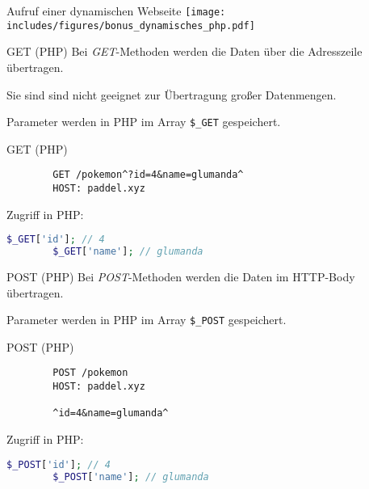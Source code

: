 \begin{bonus}{Aufruf einer dynamischen Webseite}
    \centering
    \texttt{[image: includes/figures/bonus\_dynamisches\_php.pdf]}
\end{bonus}

\begin{defi}{GET (PHP)}
    Bei \emph{GET}-Methoden werden die Daten über die Adresszeile übertragen.

    Sie sind sind nicht geeignet zur Übertragung großer Datenmengen.

    Parameter werden in PHP im Array \texttt{\$\_GET} gespeichert.
\end{defi}

\begin{example}{GET (PHP)}
    \begin{lstlisting} 
        GET /pokemon^?id=4&name=glumanda^
        HOST: paddel.xyz
    \end{lstlisting}

    Zugriff in PHP:
    \begin{lstlisting}[language=php]
        $_GET['id']; // 4
        $_GET['name']; // glumanda
    \end{lstlisting}
\end{example}

\begin{defi}{POST (PHP)}
    Bei \emph{POST}-Methoden werden die Daten im HTTP-Body übertragen.

    Parameter werden in PHP im Array \texttt{\$\_POST} gespeichert.
\end{defi}

\begin{example}{POST (PHP)}
    \begin{lstlisting} 
        POST /pokemon
        HOST: paddel.xyz

        ^id=4&name=glumanda^
    \end{lstlisting}

    Zugriff in PHP:
    \begin{lstlisting}[language=php]
        $_POST['id']; // 4
        $_POST['name']; // glumanda
    \end{lstlisting}
\end{example}

